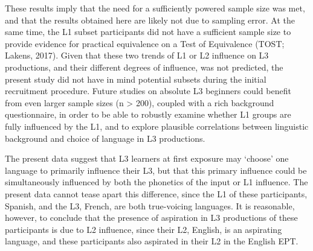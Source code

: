 \documentclass[
  english,
  man]{apa6}
\begin{document}
These results imply that the need for a sufficiently powered sample size was met, and that the results obtained here are likely not due to sampling error.
At the same time, the L1 subset participants did not have a sufficient sample size to provide evidence for practical equivalence on a Test of Equivalence (TOST; Lakens, 2017).
Given that these two trends of L1 or L2 influence on L3 productions, and their different degrees of influence, was not predicted, the present study did not have in mind potential subsets during the initial recruitment procedure.
Future studies on absolute L3 beginners could benefit from even larger sample sizes (n \textgreater{} 200), coupled with a rich background questionnaire, in order to be able to robustly examine whether L1 groups are fully influenced by the L1, and to explore plausible correlations between linguistic background and choice of language in L3 productions.

The present data suggest that L3 learners at first exposure may `choose' one language to primarily influence their L3, but that this primary influence could be simultaneously influenced by both the phonetics of the input or L1 influence.
The present data cannot tease apart this difference, since the L1 of these participants, Spanish, and the L3, French, are both true-voicing languages.
It is reasonable, however, to conclude that the presence of aspiration in L3 productions of these participants is due to L2 influence, since their L2, English, is an aspirating language, and these participants also aspirated in their L2 in the English EPT.
\end{document}
